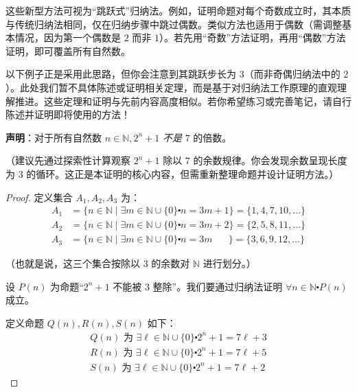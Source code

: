 这些新型方法可视为``跳跃式''归纳法。例如，证明命题对每个奇数成立时，其本质与传统归纳法相同，仅在归纳步骤中跳过偶数。类似方法也适用于偶数（需调整基本情况，因为第一个偶数是 $2$ 而非 $1$）。若先用``奇数''方法证明，再用``偶数''方法证明，即可覆盖所有自然数。

以下例子正是采用此思路，但你会注意到其跳跃步长为 $3$（而非奇偶归纳法中的 $2$）。此处我们暂不具体陈述或证明相关定理，而是基于对归纳法工作原理的直观理解推进。这些定理和证明与先前内容高度相似。若你希望练习或完善笔记，请自行陈述并证明即将使用的方法！

\begin{example}
    
    \textbf{声明}：对于所有自然数 $n \in \mathbb{N}, 2^n+1$ \emph{不是} $7$ 的倍数。

    （建议先通过探索性计算观察 $2^n + 1$ 除以 $7$ 的余数规律。你会发现余数呈现长度为 $3$ 的循环。这正是本证明的核心内容，但需重新整理命题并设计证明方法。）

    \begin{proof}
        定义集合 $A_1, A_2, A_3$ 为：
        \begin{align*}
            A_1 &= \{n \in \mathbb{N} \mid \exists m \in \mathbb{N} \cup \{0\} \centerdot n = 3m + 1\} = \{1, 4, 7, 10, \dots \} \\
            A_2 &= \{n \in \mathbb{N} \mid \exists m \in \mathbb{N} \cup \{0\} \centerdot n = 3m + 2\} = \{2, 5, 8, 11, \dots \} \\
            A_3 &= \{n \in \mathbb{N} \mid \exists m \in \mathbb{N} \cup \{0\} \centerdot n = 3m \quad\:\:\:\} = \{3, 6, 9, 12, \dots \} 
        \end{align*}

        （也就是说，这三个集合按除以 $3$ 的余数对 $\mathbb{N}$ 进行划分。）

        设 $P(n)$ 为命题``$2^n+1$ 不能被 $3$ 整除''。我们要通过归纳法证明 $\forall n \in \mathbb{N} \centerdot P(n)$ 成立。

        定义命题 $Q(n), R(n), S(n)$ 如下：
        \begin{align*}
            Q(n) \text{\ 为\ } \exists \ell \in \mathbb{N} \cup \{0\} \centerdot 2^n + 1 = 7\ell + 3 \\
            R(n) \text{\ 为\ } \exists \ell \in \mathbb{N} \cup \{0\} \centerdot 2^n + 1 = 7\ell + 5 \\
            S(n) \text{\ 为\ } \exists \ell \in \mathbb{N} \cup \{0\} \centerdot 2^n + 1 = 7\ell + 2 
        \end{align*}


\end{proof}
\end{example}

